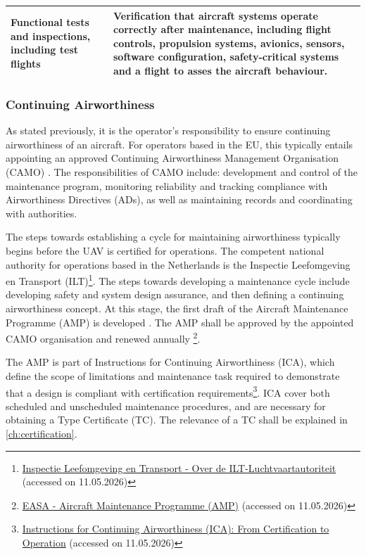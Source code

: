 \begin{longtable}{|p{}| p{}|}
Functional tests and inspections, including test flights &
Verification that aircraft systems operate correctly after maintenance, including flight controls, propulsion systems, avionics, sensors, software configuration, safety-critical systems and a flight to asses the aircraft behaviour. \\
\hline


\end{longtable}

\subsubsection*{Continuing Airworthiness}
As stated previously, it is the operator's responsibility to ensure continuing airworthiness of an aircraft. For operators based in the EU, this typically entails appointing an approved Continuing Airworthiness Management Organisation (CAMO) \cite{EASA_CAirworthiness}. The responsibilities of CAMO include: development and control of the maintenance program, monitoring reliability and tracking compliance with Airworthiness Directives (ADs), as well as maintaining records and coordinating with authorities.

The steps towards establishing a cycle for maintaining airworthiness typically begins before the UAV is certified for operations. The competent national authority for operations based in the Netherlands is the Inspectie Leefomgeving en Transport (ILT)\footnote{\label{url:ILT}\href{https://www.ilent.nl/ilt-luchtvaartautoriteit}{Inspectie Leefomgeving en Transport - Over de ILT-Luchtvaartautoriteit} (accessed on 11.05.2026)}. The steps towards developing a maintenance cycle include developing safety and system design assurance, and then defining a continuing airworthiness concept. At this stage, the first draft of the Aircraft Maintenance Programme (AMP) is developed \cite{EASA_CAirworthiness}. The AMP shall be approved by the appointed CAMO organisation and renewed annually \footnote{\href{https://www.easa.europa.eu/en/the-agency/faqs/amp-aircraft-maintenance-programme}{EASA - Aircraft Maintenance Programme (AMP)} (accessed on 11.05.2026)}.

The AMP is part of Instructions for Continuing Airworthiness (ICA), which define the scope of limitations and maintenance task required to demonstrate that a design is compliant with certification requirements\footnote{\href{https://www.leanairline.com/blog/instructions-for-continuing-airworthiness}{Instructions for Continuing Airworthiness (ICA): From Certification to Operation} (accessed on 11.05.2026)}. ICA cover both scheduled and unscheduled maintenance procedures, and are necessary for obtaining a Type Certificate (TC). The relevance of a TC shall be explained in \autoref{ch:certification}.

